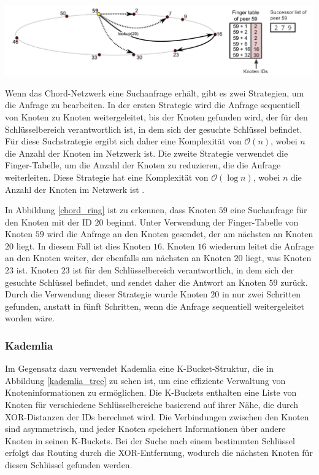 \begin{center}
    \captionsetup{type=figure}
    \includegraphics[width=1\linewidth]{images/chord_ring_altered.png}
    \label{chord_ring}
\end{center}

\noindent Wenn das Chord-Netzwerk eine Suchanfrage erhält, gibt es zwei Strategien, um die Anfrage zu bearbeiten. In der ersten Strategie wird die Anfrage sequentiell von Knoten zu Knoten weitergeleitet, bis der Knoten gefunden wird, der für den Schlüsselbereich verantwortlich ist, in dem sich der gesuchte Schlüssel befindet. Für diese Suchstrategie ergibt sich daher eine Komplexität von $\mathcal{O}(n)$, wobei $n$ die Anzahl der Knoten im Netzwerk ist. Die zweite Strategie verwendet die Finger-Tabelle, um die Anzahl der Knoten zu reduzieren, die die Anfrage weiterleiten. Diese Strategie hat eine Komplexität von $\mathcal{O}(\log n)$, wobei $n$ die Anzahl der Knoten im Netzwerk ist \parencite[S. 810-811]{MedranoChavez_ChordKademliaHighChurnScenarios}. 

In Abbildung \ref{chord_ring} ist zu erkennen, dass Knoten $59$ eine Suchanfrage für den Knoten mit der ID $20$ beginnt. Unter Verwendung der Finger-Tabelle von Knoten $59$ wird die Anfrage an den Knoten gesendet, der am nächsten an Knoten $20$ liegt. In diesem Fall ist dies Knoten $16$. Knoten $16$ wiederum leitet die Anfrage an den Knoten weiter, der ebenfalls am nächsten an Knoten $20$ liegt, was Knoten $23$ ist. Knoten $23$ ist für den Schlüsselbereich verantwortlich, in dem sich der gesuchte Schlüssel befindet, und sendet daher die Antwort an Knoten $59$ zurück. Durch die Verwendung dieser Strategie wurde Knoten $20$ in nur zwei Schritten gefunden, anstatt in fünft Schritten, wenn die Anfrage sequentiell weitergeleitet worden wäre.    

\subsubsection{Kademlia}
Im Gegensatz dazu verwendet Kademlia eine K-Bucket-Struktur, die in Abbildung \ref{kademlia_tree} zu sehen ist, um eine effiziente Verwaltung von Knoteninformationen zu ermöglichen. Die K-Buckets enthalten eine Liste von Knoten für verschiedene Schlüsselbereiche basierend auf ihrer Nähe, die durch XOR-Distanzen der IDs berechnet wird. Die Verbindungen zwischen den Knoten sind asymmetrisch, und jeder Knoten speichert Informationen über andere Knoten in seinen K-Buckets. Bei der Suche nach einem bestimmten Schlüssel erfolgt das Routing durch die XOR-Entfernung, wodurch die nächsten Knoten für diesen Schlüssel gefunden werden.

